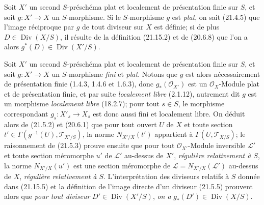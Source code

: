 \begin{env}[21.15.7]
\label{IV.21.15.7}
Soit $X'$ un second $S$-préschéma plat et localement de présentation finie sur $S$, et
soit $g:X'\to X$ un $S$-morphisme. Si le $S$-morphisme $g$ est \emph{plat}, on sait
(21.4.5) que l'image réciproque par $g$ de tout diviseur sur $X$ est définie; si de
plus $D\in\operatorname{Div}(X/S)$, il résulte de la définition (21.15.2) et de
(20.6.8) que l'on a alors $g^*(D)\in\operatorname{Div}(X'/S)$.
\end{env}

\begin{env}[21.15.8]
\label{IV.21.15.8}
Soit $X'$ un second $S$-préschéma plat et localement de présentation finie sur $S$, et
soit $g:X'\to X$ un $S$-morphisme \emph{fini} et \emph{plat}. Notons que $g$ est alors
nécessairement de présentation finie (1.4.3, 1.4.6 et 1.6.3), donc
$g_*(\mathcal O_{X'})$ est un $\mathcal O_X$-Module plat et de présentation finie, et
par suite \emph{localement libre} (2.1.12), autrement dit $g$ est un morphisme
\emph{localement libre} (18.2.7); pour tout $s\in S$, le morphisme correspondant
$g_s:X'_s\to X_s$ est donc aussi fini et localement libre. On déduit alors de (21.5.2)
et (20.6.1) que pour tout ouvert $U$ de $X$ et toute section
$t'\in\Gamma(g^{-1}(U),\mathscr T_{X'/S})$, la norme $N_{X'/X}(t')$ appartient à
$\Gamma(U,\mathscr T_{X/S})$; le raisonnement de (21.5.3) prouve ensuite que pour tout
$\mathcal O_{X'}$-Module inversible $\mathscr L'$ et toute section méromorphe $u'$ de
$\mathscr L'$ au-dessus de $X'$, \emph{régulière relativement à $S$}, la norme
$N_{X'/X}(u')$ est une section méromorphe de
$\mathscr L=N_{X'/X}(\mathscr L')$ au-dessus de $X$, \emph{régulière relativement à $S$}.
L'interprétation des diviseurs relatifs à $S$ donnée dans (21.15.5) et la définition de
l'image directe d'un diviseur (21.5.5) prouvent alors que \emph{pour tout diviseur}
$D'\in\operatorname{Div}(X'/S)$, \emph{on a} $g_*(D')\in\operatorname{Div}(X/S)$.
\end{env}

